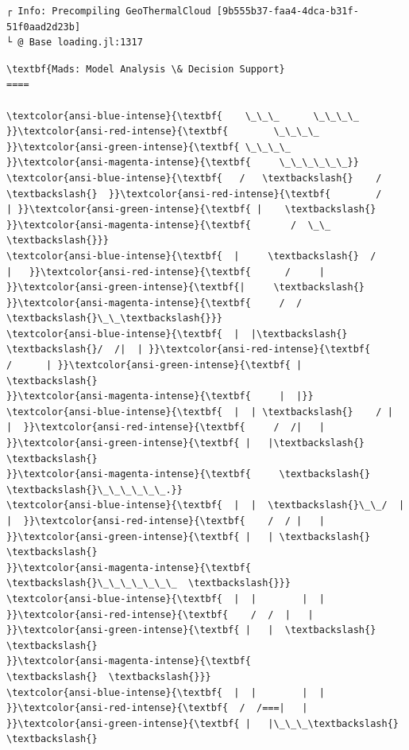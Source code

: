 \documentclass[11pt]{article}
\begin{document}
    \begin{Verbatim}[commandchars=\\\{\}]
┌ Info: Precompiling GeoThermalCloud [9b555b37-faa4-4dca-b31f-51f0aad2d23b]
└ @ Base loading.jl:1317
    \end{Verbatim}

    \begin{Verbatim}[commandchars=\\\{\}]
\textbf{Mads: Model Analysis \& Decision Support}
====

\textcolor{ansi-blue-intense}{\textbf{    \_\_\_      \_\_\_\_    }}\textcolor{ansi-red-intense}{\textbf{        \_\_\_\_   }}\textcolor{ansi-green-intense}{\textbf{ \_\_\_\_
}}\textcolor{ansi-magenta-intense}{\textbf{     \_\_\_\_\_\_}}
\textcolor{ansi-blue-intense}{\textbf{   /   \textbackslash{}    /    \textbackslash{}  }}\textcolor{ansi-red-intense}{\textbf{        /    | }}\textcolor{ansi-green-intense}{\textbf{ |    \textbackslash{}
}}\textcolor{ansi-magenta-intense}{\textbf{       /  \_\_  \textbackslash{}}}
\textcolor{ansi-blue-intense}{\textbf{  |     \textbackslash{}  /     |   }}\textcolor{ansi-red-intense}{\textbf{      /     |  }}\textcolor{ansi-green-intense}{\textbf{|     \textbackslash{}
}}\textcolor{ansi-magenta-intense}{\textbf{     /  /  \textbackslash{}\_\_\textbackslash{}}}
\textcolor{ansi-blue-intense}{\textbf{  |  |\textbackslash{}  \textbackslash{}/  /|  | }}\textcolor{ansi-red-intense}{\textbf{       /      | }}\textcolor{ansi-green-intense}{\textbf{ |      \textbackslash{}
}}\textcolor{ansi-magenta-intense}{\textbf{     |  |}}
\textcolor{ansi-blue-intense}{\textbf{  |  | \textbackslash{}    / |  |  }}\textcolor{ansi-red-intense}{\textbf{     /  /|   | }}\textcolor{ansi-green-intense}{\textbf{ |   |\textbackslash{}  \textbackslash{}
}}\textcolor{ansi-magenta-intense}{\textbf{     \textbackslash{}  \textbackslash{}\_\_\_\_\_\_.}}
\textcolor{ansi-blue-intense}{\textbf{  |  |  \textbackslash{}\_\_/  |  |  }}\textcolor{ansi-red-intense}{\textbf{    /  / |   | }}\textcolor{ansi-green-intense}{\textbf{ |   | \textbackslash{}  \textbackslash{}
}}\textcolor{ansi-magenta-intense}{\textbf{      \textbackslash{}\_\_\_\_\_\_\_  \textbackslash{}}}
\textcolor{ansi-blue-intense}{\textbf{  |  |        |  | }}\textcolor{ansi-red-intense}{\textbf{    /  /  |   | }}\textcolor{ansi-green-intense}{\textbf{ |   |  \textbackslash{}  \textbackslash{}
}}\textcolor{ansi-magenta-intense}{\textbf{             \textbackslash{}  \textbackslash{}}}
\textcolor{ansi-blue-intense}{\textbf{  |  |        |  |  }}\textcolor{ansi-red-intense}{\textbf{  /  /===|   | }}\textcolor{ansi-green-intense}{\textbf{ |   |\_\_\_\textbackslash{}  \textbackslash{}

\end{Verbatim}
\end{document}
